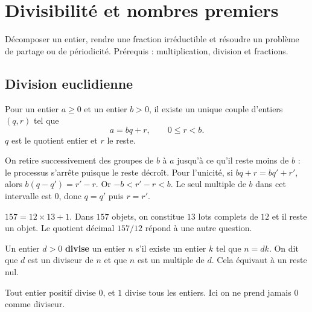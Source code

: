 \documentclass[../cours_3e.tex]{subfiles}
\begin{document}
\setcounter{chapter}{2}
\chapter{Divisibilité et nombres premiers}
\label{ch:arithmetique}
\begin{objectif}
Décomposer un entier, rendre une fraction irréductible et résoudre un problème de partage ou de périodicité. Prérequis : multiplication, division et fractions.
\end{objectif}
\section{Division euclidienne}
\begin{theoreme}
Pour un entier $a\geq0$ et un entier $b>0$, il existe un unique couple d'entiers $(q,r)$ tel que
\[a=bq+r,\qquad 0\leq r<b.\]
$q$ est le quotient entier et $r$ le reste.
\end{theoreme}
\begin{demonstration}
On retire successivement des groupes de $b$ à $a$ jusqu'à ce qu'il reste moins de $b$ : le processus s'arrête puisque le reste décroît. Pour l'unicité, si $bq+r=bq'+r'$, alors $b(q-q')=r'-r$. Or $-b<r'-r<b$. Le seul multiple de $b$ dans cet intervalle est $0$, donc $q=q'$ puis $r=r'$.
\end{demonstration}
\begin{exemple}
$157=12\times13+1$. Dans $157$ objets, on constitue $13$ lots complets de $12$ et il reste un objet. Le quotient décimal $157/12$ répond à une autre question.
\end{exemple}
\begin{definition}
Un entier $d>0$ \textbf{divise} un entier $n$ s'il existe un entier $k$ tel que $n=dk$. On dit que $d$ est un diviseur de $n$ et que $n$ est un multiple de $d$. Cela équivaut à un reste nul.
\end{definition}
Tout entier positif divise $0$, et $1$ divise tous les entiers. Ici on ne prend jamais $0$ comme diviseur.
\end{document}
